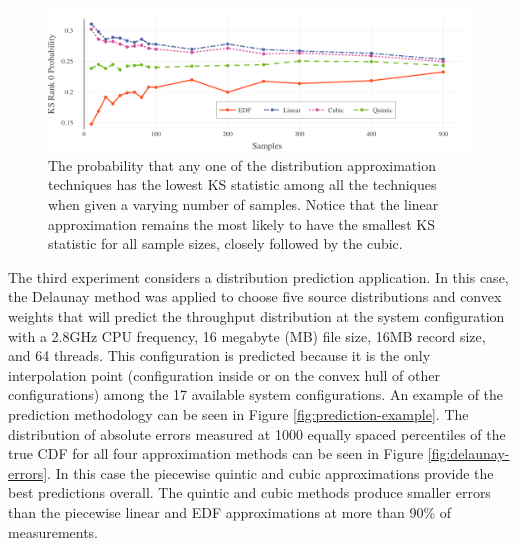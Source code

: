 \documentclass[letterpaper, 10 pt, conference]{ieeeconf}  %
\begin{document}
\begin{figure}
  \vspace{-.3cm}
  \includegraphics[width=1\textwidth]{KS-rank-0-probability.pdf}
  \caption{The probability that any one of the distribution approximation techniques has the lowest KS statistic among all the techniques when given a varying number of samples. Notice that the linear approximation remains the most likely to have the smallest KS statistic for all sample sizes, closely followed by the cubic.
  \vspace{-.5cm}}
  \label{fig:ks-rank-0}
\end{figure}


The third experiment considers a distribution prediction application. In this case, the Delaunay method was applied to choose five source distributions and convex weights that will predict the throughput distribution at the system configuration with a 2.8GHz CPU frequency, 16 megabyte (MB) file size, 16MB record size, and 64 threads. This configuration is predicted because it is the only interpolation point (configuration inside or on the convex hull of other configurations) among the 17 available system configurations. An example of the prediction methodology can be seen in Figure \ref{fig:prediction-example}. The distribution of absolute errors measured at 1000 equally spaced percentiles of the true CDF for all four approximation methods can be seen in Figure \ref{fig:delaunay-errors}. In this case the piecewise quintic and cubic approximations provide the best predictions overall. The quintic and cubic methods produce smaller errors than the piecewise linear and EDF approximations at more than 90\% of measurements.
\end{document}
